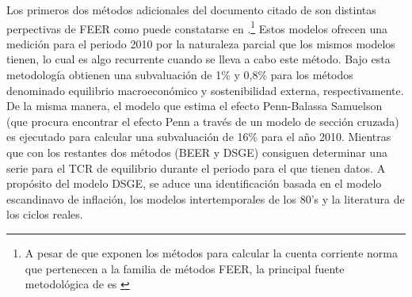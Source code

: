 \documentclass[12pt,letterpaper]{article}
\begin{document}
Los primeros dos métodos adicionales del documento citado de \cite{cerezo2011tipo} son distintas perpectivas de FEER como puede constatarse en \cite{bussiere2010methodological}.\footnote{A pesar de que \cite{bussiere2010methodological} exponen los métodos para calcular la cuenta corriente norma que pertenecen a la familia de métodos FEER, la principal fuente metodológica de \cite{cerezo2011tipo} es \cite{isard2007equilibrium}} Estos modelos ofrecen una medición para el periodo 2010 por la naturaleza parcial que los mismos modelos tienen, lo cual es algo recurrente cuando se lleva a cabo este método. Bajo esta metodología obtienen una subvaluación de 1\% y 0,8\% para los métodos denominado equilibrio macroeconómico y sostenibilidad externa, respectivamente. De la misma manera, el modelo que estima el efecto Penn-Balassa Samuelson (que procura encontrar el efecto Penn a través de un modelo de sección cruzada) es ejecutado para calcular una subvaluación de 16\% para el año 2010. Mientras que con los restantes dos métodos (BEER y DSGE) consiguen determinar una serie para el TCR de equilibrio durante el periodo para el que tienen datos. A propósito del modelo DSGE, se aduce una identificación basada en el modelo escandinavo de inflación, los modelos intertemporales de los 80's y la literatura de los ciclos reales.
\end{document}

